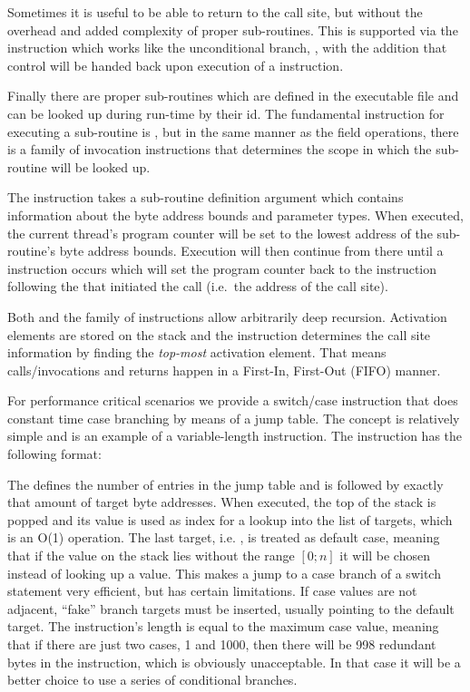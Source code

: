 Sometimes it is useful to be able to return to the call site, but without the
overhead and added complexity of proper sub-routines. This is supported via the
 instruction which works like the unconditional branch, ,
with the addition that control will be handed back upon execution of a
 instruction.

Finally there are proper sub-routines which are defined in the executable file
and can be looked up during run-time by their id. The fundamental instruction
for executing a sub-routine is , but in the same manner as the
field operations, there is a family of invocation instructions that determines
the scope in which the sub-routine will be looked up.

The  instruction takes a sub-routine definition argument which
contains information about the byte address bounds and parameter types. When
executed, the current thread's program counter will be set to the lowest address
of the sub-routine's byte address bounds. Execution will then continue from
there until a  instruction occurs which will set the program
counter back to the instruction following the  that initiated the
call (i.e.~the address of the call site).

Both  and the  family of instructions allow
arbitrarily deep recursion. Activation elements are stored on the stack and the
 instruction determines the call site information by finding the
\emph{top-most} activation element. That means calls/invocations and returns
happen in a First-In, First-Out (FIFO) manner.

For performance critical scenarios we provide a switch/case instruction that
does constant time case branching by means of a jump table. The concept is
relatively simple and is an example of a variable-length instruction. The
 instruction has the following format:


The  defines the number of entries in the jump table and is
followed by exactly that amount of target byte addresses. When executed, the top
of the stack is popped and its value is used as index for a lookup into the list
of targets, which is an O(1) operation. The last target, i.e. ,
is treated as default case, meaning that if the value on the stack lies without
the range $[0;n]$ it will be chosen instead of looking up a value. This makes a
jump to a case branch of a switch statement very efficient, but has certain
limitations. If case values are not adjacent, ``fake'' branch targets must be
inserted, usually pointing to the default target. The instruction's length is
equal to the maximum case value, meaning that if there are just two cases, 1 and
1000, then there will be 998 redundant bytes in the instruction, which is
obviously unacceptable. In that case it will be a better choice to use a series
of conditional branches.

